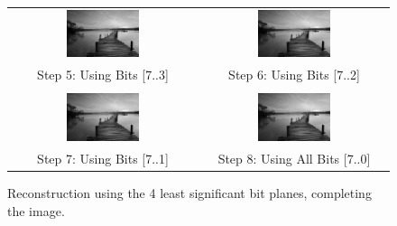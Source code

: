 \documentclass{article}
\begin{document}
\begin{figure}[H]
    \centering
    \begin{tabular}{cc}
        \includegraphics[width=0.4\textwidth]{images/reconstructed_step_5.png} &
        \includegraphics[width=0.4\textwidth]{images/reconstructed_step_6.png} \\
        Step 5: Using Bits [7..3] & Step 6: Using Bits [7..2] \\
        \\
        \includegraphics[width=0.4\textwidth]{images/reconstructed_step_7.png} &
        \includegraphics[width=0.4\textwidth]{images/reconstructed_step_8.png} \\
        Step 7: Using Bits [7..1] & Step 8: Using All Bits [7..0] \\
    \end{tabular}
    \caption{Reconstruction using the 4 least significant bit planes, completing the image.}
    \label{fig:recon2}
\end{figure}
\end{document}
